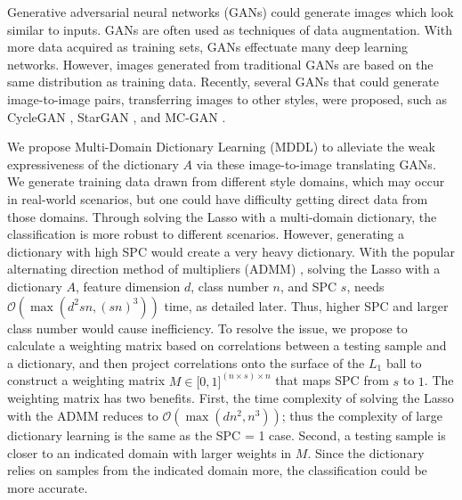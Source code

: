\documentclass{article}
\begin{document}
Generative adversarial neural networks (GANs) \cite{goodfellow2014generative} could generate images which look similar to inputs. GANs are often used as techniques of data augmentation. With more data acquired as training sets, GANs effectuate many deep learning networks. However, images generated from traditional GANs are based on the same distribution as training data. Recently, several GANs that could generate image-to-image pairs, transferring images to other styles, were proposed, such as CycleGAN \cite{zhu2017unpaired}, StarGAN \cite{choi2018stargan}, and MC-GAN \cite{azadi2018multi}.

We propose Multi-Domain Dictionary Learning (MDDL) to alleviate the weak expressiveness of the dictionary $A$ via these image-to-image translating GANs. We generate training data drawn from different style domains, which may occur in real-world scenarios, but one could have difficulty getting direct data from those domains. Through solving the Lasso with a multi-domain dictionary, the classification is more robust to different scenarios. However, generating a dictionary with high SPC would create a very heavy dictionary. With the popular alternating direction method of multipliers (ADMM) \cite{boyd2011distributed} \cite{lu2018unified}, solving the Lasso with a dictionary $A$, feature dimension $d$, class number $n$, and SPC $s$, needs $\mathcal{O}(\max( d^2 sn, (sn)^{3}))$ time, as detailed later. Thus, higher SPC and larger class number would cause inefficiency. To resolve the issue, we propose to calculate a weighting matrix based on correlations between a testing sample and a dictionary, and then project correlations onto the surface of the $L_1$ ball to construct a weighting matrix $M \in \lbrack 0,1 \rbrack ^{(n \times s) \times n}$ that maps SPC from $s$ to $1$. The weighting matrix has two benefits. First, the time complexity of solving the Lasso with the ADMM reduces to $\mathcal{O}(\max( dn^{2}, n^{3}))$; thus the complexity of large dictionary learning is the same as the SPC = 1 case. Second, a testing sample is closer to an indicated domain with larger weights in $M$. Since the dictionary relies on samples from the indicated domain more, the classification could be more accurate.
\end{document}
